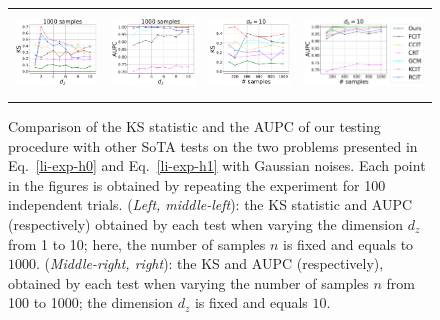 \begin{figure}[htb]
{\label{fig-exp-li-type-supp}}
\vspace{-0.5cm}
\end{figure}


\begin{figure}[ht]
\begin{tabular}{cccc} 
\includegraphics[height=2.2cm]{sections/appendix/independence_testing_kernel/figures_supp_mat/nsamples_fixed_1000_li_dim_1_10_ks.pdf}& \includegraphics[height=2.2cm]{sections/appendix/independence_testing_kernel/figures_supp_mat/nsamples_fixed_1000_li_dim_1_10_aupc.pdf} & 
\includegraphics[height=2.2cm]{sections/appendix/independence_testing_kernel/figures_supp_mat/dim_fixed_10_li_ks.pdf}& \includegraphics[height=2.2cm]{sections/appendix/independence_testing_kernel/figures_supp_mat/dim_fixed_10_li_aupc.pdf}
\end{tabular}
\caption{Comparison of the KS statistic and the AUPC of our testing procedure with other SoTA tests on the two problems presented in Eq.~\eqref{li-exp-h0} and Eq.~\eqref{li-exp-h1} with Gaussian noises. Each point in the figures is obtained by repeating the experiment for 100 independent trials. (\emph{Left, middle-left}): the KS statistic and AUPC (respectively) obtained by each test when varying the dimension $d_z$ from 1 to 10; here, the number of samples $n$ is fixed and equals to $1000$. (\emph{Middle-right, right}): the KS and AUPC (respectively), obtained by each test when varying the number of samples $n$ from 100 to 1000; the dimension $d_z$ is fixed and equals $10$.
\label{fig-exp-li-ks-gauss-supp}}
\vspace{-0.8cm}
\end{figure}


